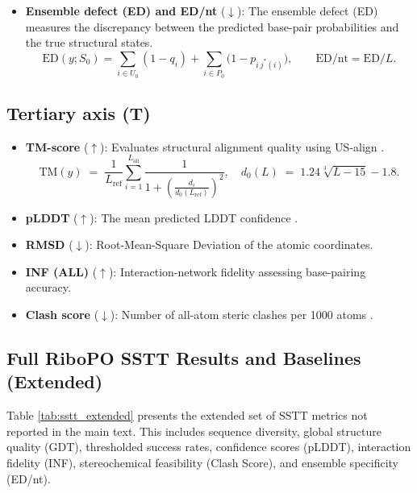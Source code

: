 {\begin{itemize}[leftmargin=1.2em,itemsep=2pt,topsep=2pt]
\item \textbf{Ensemble defect (ED) \citep{zadeh2011nucleic} and ED/nt} ($\downarrow$): The ensemble defect (ED) measures the discrepancy between the predicted base-pair probabilities and the true structural states.
\[
\mathrm{ED}(y;S_0)=\sum_{i\in U_0}(1-q_i)+\sum_{i\in P_0}\big(1-p_{i\,j^*(i)}\big),\qquad \mathrm{ED/nt}=\mathrm{ED}/L.
\]
\end{itemize}

\subsection*{Tertiary axis (T)}
\begin{itemize}[leftmargin=1.2em,itemsep=2pt,topsep=2pt]
\item \textbf{TM-score} \citep{zhang2004tmscore} ($\uparrow$): Evaluates structural alignment quality using US-align \citep{zhang2022usalign}.
$$
\mathrm{TM}(y) \;=\; \frac{1}{L_{\mathrm{ref}}} \sum_{i=1}^{L_{\mathrm{ali}}} \frac{1}{1 + \left(\frac{d_i}{d_0(L_{\mathrm{ref}})}\right)^2},
\quad
d_0(L) \;=\; 1.24\sqrt[3]{L-15}-1.8.
$$

\item \textbf{pLDDT} ($\uparrow$): The mean predicted LDDT confidence \citep{jumper2021alphafold2}.
\item \textbf{RMSD} ($\downarrow$): Root-Mean-Square Deviation of the atomic coordinates.
\item \textbf{INF (ALL)} \citep{parisien2009newmetricsinf} ($\uparrow$): Interaction-network fidelity assessing base-pairing accuracy.
\item \textbf{Clash score} ($\downarrow$): Number of all-atom steric clashes per 1000 atoms \citep{word1999clashscore}.
\end{itemize}

% 

\subsection{{Full RiboPO SSTT Results and Baselines (Extended)}}
\label{sec:full_results_appendix}

{
Table \ref{tab:sstt_extended} presents the extended set of SSTT metrics not reported in the main text. This includes sequence diversity, global structure quality (GDT), thresholded success rates, confidence scores (pLDDT), interaction fidelity (INF), stereochemical feasibility (Clash Score), and ensemble specificity (ED/nt).

}}
